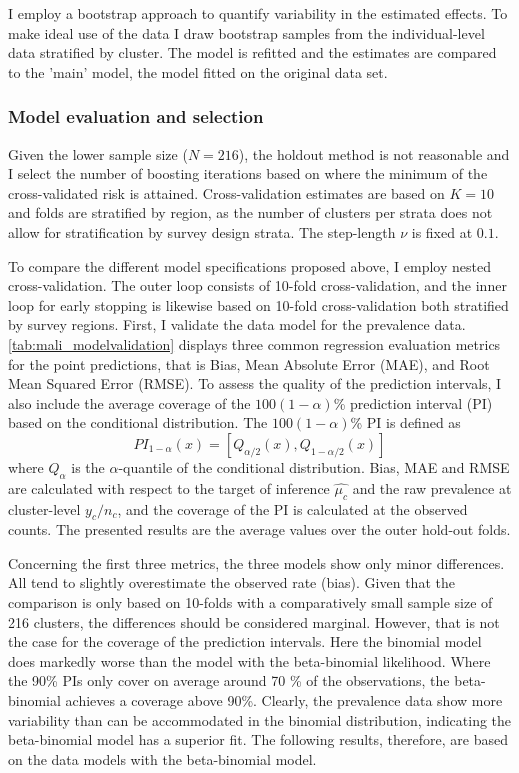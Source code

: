 I employ a bootstrap approach to quantify variability in the estimated effects. To make ideal use of the data I draw bootstrap samples from the individual-level data stratified by cluster. The model is refitted and the estimates are compared to the 'main' model, the model fitted on the original data set.



\subsubsection*{Model evaluation and selection}

Given the lower sample size ($N = 216$), the holdout method is not reasonable and I select the number of boosting iterations based on where the minimum of the cross-validated risk is attained. Cross-validation estimates are based on $K=10$ and folds are stratified by region, as the number of clusters per strata does not allow for stratification by survey design strata. The step-length $\nu$ is fixed at $0.1$.

To compare the different model specifications proposed above, I employ nested cross-validation. The outer loop consists of 10-fold cross-validation, and the inner loop for early stopping is likewise based on 10-fold cross-validation both stratified by survey regions. First, I validate the data model for the prevalence data.  \autoref{tab:mali_modelvalidation} displays three common regression evaluation metrics for the point predictions, that is Bias, Mean Absolute Error (MAE), and Root Mean Squared Error (RMSE). To assess the quality of the prediction intervals, I also include the average coverage of the $100(1-\alpha)$\% prediction interval (PI) based on the conditional distribution. The $100(1-\alpha)$\% PI is defined as
\begin{equation*}
	PI_{1-\alpha}(x) = \left[Q_{\alpha / 2}(x), Q_{1-\alpha / 2}(x)\right]
\end{equation*}
where $Q_{\alpha}$ is the $\alpha$-quantile of the conditional distribution. Bias, MAE and RMSE are calculated with respect to the target of inference $\hat{\mu_c}$ and the raw prevalence at cluster-level $y_c / n_c$, and the coverage of the PI is calculated at the observed counts. The presented results are the average values over the outer hold-out folds.

Concerning the first three metrics, the three models show only minor differences. All tend to slightly overestimate the observed rate (bias). Given that the comparison is only based on 10-folds with a comparatively small sample size of 216 clusters, the differences should be considered marginal. However, that is not the case for the coverage of the prediction intervals. Here the binomial model does markedly worse than the model with the beta-binomial likelihood. Where the 90\% PIs only cover on average around 70 \% of the observations, the beta-binomial achieves a coverage above 90\%. Clearly, the prevalence data show more variability than can be accommodated in the binomial distribution, indicating the beta-binomial model has a superior fit. The following results, therefore, are based on the data models with the beta-binomial model.

